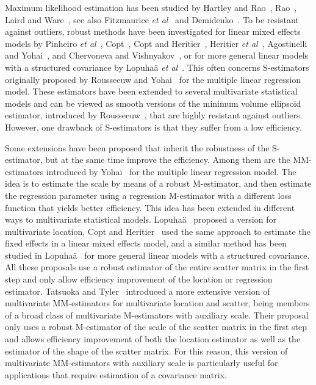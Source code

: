 \documentclass{article}
\numberwithin{equation}{section}
\theoremstyle{plain}
\begin{document}
Maximum likelihood estimation has been studied by Hartley and Rao~\cite{hartley&rao1967},
Rao~\cite{rao1972}, Laird and Ware~\cite{laird&ware1982},
see also Fitzmaurice \emph{et al}~\cite{fitzmaurice-laird-ware2011} and Demidenko~\cite{demidenko2013}.
To be resistant against outliers, robust methods have been investigated for linear mixed effects models
by Pinheiro \emph{et al}~\cite{pinheiro-liu-wu2001},
Copt~\cite{copt2006high},
Copt and Heritier~\cite{copt&heritier2007},
Heritier \emph{et al}~\cite{heritier-cantoni-copt-victoriafeser2009},
Agostinelli and Yohai~\cite{agostinelli2016composite},
and Chervoneva and Vishnyakov~\cite{chervoneva2014},
or for more general linear models with a structured covariance by Lopuha\"a \emph{et al}~\cite{lopuhaa-gares-ruizgazen2023}.
This often concerns S-estimators originally proposed by Rousseeuw and Yohai~\cite{rousseeuw-yohai1984}
for the multiple linear regression model.
These estimators have been extended to several multivariate statistical models
and can be viewed as smooth versions of the minimum volume ellipsoid estimator,
introduced by Rousseeuw~\cite{rousseeuw1985}, 
that are highly resistant against outliers.
However, one drawback of S-estimators is that they suffer from a low efficiency.

Some extensions have been proposed that inherit the robustness of the S-estimator,
but at the same time improve the efficiency.
Among them are the MM-estimators introduced by Yohai~\cite{yohai1987} for the multiple linear regression model.
The idea is to estimate the scale by means of a robust M-estimator, and then estimate
the regression parameter using a regression M-estimator with a different loss function
that yields better efficiency.
This idea has been extended in different ways to multivariate statistical models.
Lopuha\"a~\cite{lopuhaa1992highly} proposed a version for multivariate location,
Copt and Heritier~\cite{copt&heritier2007} used the same approach to estimate the fixed effects 
in a linear mixed effects model, and a similar method has been studied in Lopuha\"a~\cite{lopuhaa2023}
for more general linear models with a structured covariance.
All these proposals use a robust estimator of the entire scatter matrix in the first step
and only allow efficiency improvement of the location or regression estimator.
Tatsuoka and Tyler~\cite{tatsuoka&tyler2000} introduced a more extensive version of 
multivariate MM-estimators for multivariate location and scatter, 
being members of a broad class of multivariate M-estimators with auxiliary scale.
Their proposal only uses a robust M-estimator of the scale of the scatter matrix in the first step
and allows efficiency improvement of both the location estimator as well as the estimator
of the shape of the scatter matrix.
For this reason, this version of multivariate MM-estimators with auxiliary scale
is particularly useful for applications that require estimation of a covariance matrix.
\end{document}

